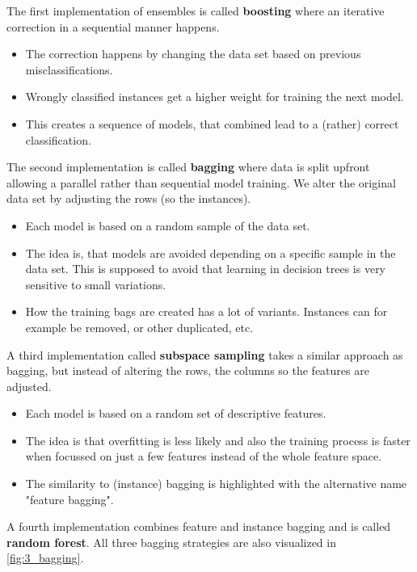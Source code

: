 The first implementation of ensembles is called \textbf{boosting} where an iterative correction in a sequential manner happens. 
\begin{itemize}
  \item The correction happens by changing the data set based on previous misclassifications.
  \item Wrongly classified instances get a higher weight for training the next model.
  \item This creates a sequence of models, that combined lead to a (rather) correct classification.
\end{itemize}

The second implementation is called \textbf{bagging} where data is split upfront allowing a parallel rather than sequential model training. We alter the original data set by adjusting the rows (so the instances).
\begin{itemize}
  \item Each model is based on a random sample of the data set.
  \item The idea is, that models are avoided depending on a specific sample in the data set. This is supposed to avoid that learning in decision trees is very sensitive to small variations.
  \item How the training bags are created has a lot of variants. Instances can for example be removed, or other duplicated, etc.
\end{itemize}

A third implementation called \textbf{subspace sampling} takes a similar approach as bagging, but instead of altering the rows, the columns so the features are adjusted.
\begin{itemize}
  \item Each model is based on a random set of descriptive features.
  \item The idea is that overfitting is less likely and also the training process is faster when focussed on just a few features instead of the whole feature space.
  \item The similarity to (instance) bagging is highlighted with the alternative name "feature bagging".
\end{itemize}

A fourth implementation combines feature and instance bagging and is called \textbf{random forest}. All three bagging strategies are also visualized in \ref{fig:3_bagging}.

